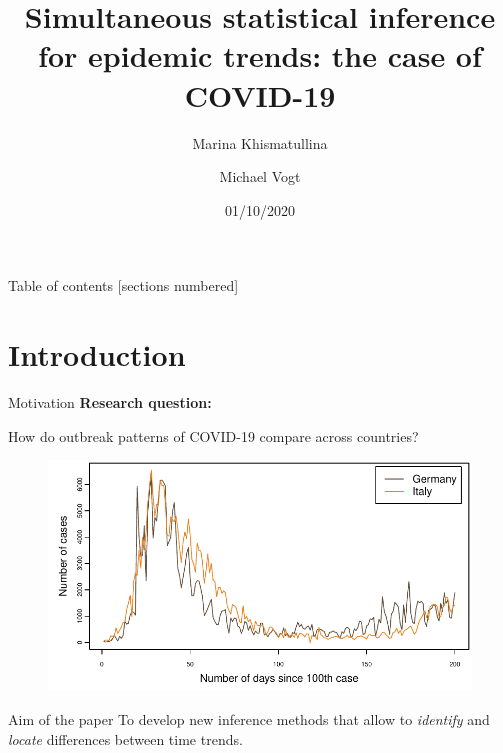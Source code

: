 \documentclass[10pt]{beamer}
\title{Simultaneous statistical inference for epidemic trends: the case of COVID-19}
\date{01/10/2020}
\author{Marina Khismatullina \and Michael Vogt}
\begin{document}
\maketitle

\begin{frame}{Table of contents}
  [sections numbered]
  \tableofcontents[hideallsubsections]
\end{frame}

\section{Introduction}


\begin{frame}{Motivation}
	\textbf{Research question:}
	
	How do outbreak patterns of COVID-19 compare across countries?
	\begin{figure}
    		\centering
    		\includegraphics[height=0.45\textheight]{plots/Germany_and_Italy.pdf}
    		\label{fig:DEUvsITA}
  	\end{figure}\pause
	\vspace{-3mm}
	\begin{block}{Aim of the paper}
	To develop new inference methods that allow to \textit{identify} and \textit{locate} differences between time trends.
	\end{block}
\end{frame}
\end{document}
